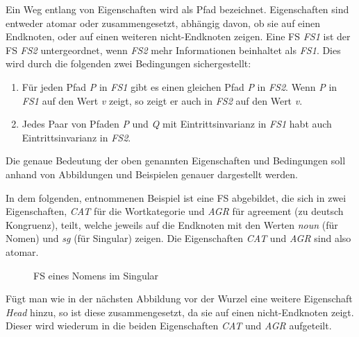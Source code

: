 \documentclass[12pt]{report}
\begin{document}
Ein Weg entlang von Eigenschaften wird als Pfad bezeichnet. Eigenschaften sind entweder atomar oder zusammengesetzt, abhängig davon, ob sie auf einen Endknoten, oder auf einen weiteren nicht-Endknoten zeigen.
Eine FS \textit{FS1} ist der FS \textit{FS2} untergeordnet, wenn \textit{FS2} mehr Informationen beinhaltet als \textit{FS1}. Dies wird durch die folgenden zwei Bedingungen sichergestellt:

\begin{enumerate}
\item Für jeden Pfad \textit{P} in \textit{FS1} gibt es einen gleichen Pfad \textit{P} in \textit{FS2}. Wenn \textit{P} in \textit{FS1} auf den Wert \textit{v} zeigt, so zeigt er auch in \textit{FS2} auf den Wert \textit{v}.
\item Jedes Paar von Pfaden \textit{P} und \textit{Q} mit Eintrittsinvarianz in \textit{FS1} habt auch Eintrittsinvarianz in \textit{FS2}.
\end{enumerate}

Die genaue Bedeutung der oben genannten Eigenschaften und Bedingungen soll anhand von Abbildungen und Beispielen genauer dargestellt werden. 

In dem folgenden, \cite{cop04} entnommenen Beispiel ist eine FS abgebildet, die sich in zwei Eigenschaften, \textit{\glqq  CAT\grqq{}} für die Wortkategorie und \textit{\glqq  AGR\grqq{}} für agreement (zu deutsch \glqq  Kongruenz\grqq{}), teilt, welche jeweils auf die Endknoten mit den Werten \textit{\glqq  noun\grqq{}} (für Nomen) und \textit{\glqq  sg\grqq{}} (für Singular) zeigen. Die Eigenschaften \textit{\glqq  CAT\grqq{}} und \textit{\glqq  AGR\grqq{}} sind also atomar.

\begin{figure}[h!]
\begin{center}
\caption{FS eines Nomens im Singular \cite{cop04}}
\end{center}
\end{figure}

Fügt man wie in der nächsten Abbildung vor der Wurzel eine weitere Eigenschaft \textit{\glqq  Head\grqq{}} hinzu, so ist diese zusammengesetzt, da sie auf einen nicht-Endknoten zeigt. Dieser wird wiederum in die beiden Eigenschaften \textit{\glqq  CAT\grqq{}} und \textit{\glqq  AGR\grqq{}} aufgeteilt. 
\end{document}
